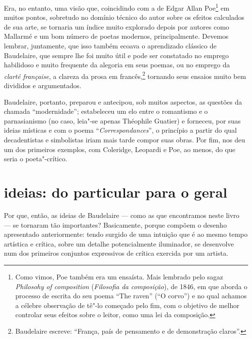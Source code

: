 Era, no entanto, uma visão que, coincidindo com a de Edgar Allan Poe\footnote{ Como 
vimos, Poe também era um ensaísta. Mais lembrado
pelo sagaz \textit{Philosohy of composition} (\textit{Filosofia da composição}),
de 1846, em que aborda o processo de escrita do seu poema ``The raven”
(``O corvo'') e no qual achamos a célebre observação de tê"-lo começado pelo
fim, com o objetivo de melhor controlar seus efeitos sobre o leitor,
como uma lei da composição.} em muitos pontos, sobretudo no domínio
técnico do autor sobre os efeitos calculados de sua arte, se tornaria
um índice muito explorado depois por autores como Mallarmé e um bom
número de poetas modernos, principalmente. Devemos lembrar, juntamente,
que isso também ecoava o aprendizado clássico de Baudelaire, que sempre
lhe foi muito útil e pode ser constatado no emprego habilidoso e muito
frequente da alegoria em seus poemas, ou no emprego da \textit{clarté
française}, a clareza da prosa em francês,\footnote{ Baudelaire escreve:
“França, país de pensamento e de demonstração claros”.} tornando seus	
ensaios muito bem divididos e argumentados.

Baudelaire, portanto, preparou e antecipou, sob muitos aspectos, as
questões da chamada “modernidade”; estabeleceu um elo entre o
romantismo e o parnasianismo (no caso, leia"-se apenas 
Théophile Guatier) e forneceu, por suas ideias místicas e com o poema
“\textit{Correspondances}”, o princípio a partir do qual decadentistas e
simbolistas iriam mais tarde compor suas obras. Por fim, nos deu um dos
primeiros exemplos, com Coleridge, Leopardi e Poe, 
ao menos, do que seria o poeta"-crítico. 

\section{ideias: do particular para o geral}
Por que, então, as ideias de Baudelaire --- como as que encontramos
neste livro --- se tornaram tão importantes? Basicamente, porque
compõem o desenho apresentado anteriormente: tendo surgido de uma intuição que
é ao mesmo tempo artística e crítica, sobre um detalhe potencialmente
iluminador, se desenvolve num dos primeiros conjuntos expressivos de
crítica exercida por um artista. 

